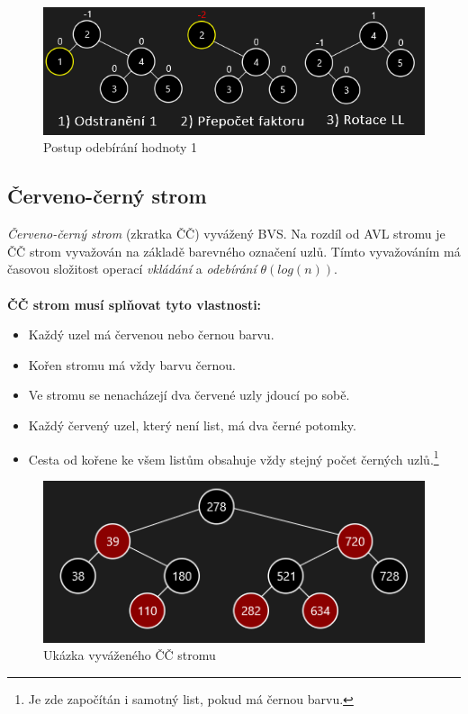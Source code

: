 \documentclass[
  biblatex=false,
  font=serif,
  glossaries=false,
  tables=false,
  theorems=false,
  index
]{kidiplom}
\begin{document}
\begin{figure}[h!]
\centering
	\includegraphics[scale=0.55]{obrazky/16AVLOdebirani.png}
	\caption{Postup odebírání hodnoty 1}
\end{figure}

\newpage
\subsection{Červeno-černý strom}
\indent\indent\textit{Červeno-černý strom} (zkratka ČČ) vyvážený BVS. Na rozdíl od AVL stromu je ČČ strom vyvažován na základě barevného označení uzlů. Tímto vyvažováním má časovou složitost operací \textit{vkládání} a \textit{odebírání} $\theta(log (n))$.\\
\indent\textit{}\cite{dvorsky}\\

\noindent\textbf{ČČ strom musí splňovat tyto vlastnosti:}
\begin{itemize}
\item Každý uzel má červenou nebo černou barvu.
\item Kořen stromu má vždy barvu černou.
\item Ve stromu se nenacházejí dva červené uzly jdoucí po sobě.
\item Každý červený uzel, který není list, má dva černé potomky.
\item Cesta od kořene ke všem listům obsahuje vždy stejný počet černých uzlů.\footnote{Je zde započítán i samotný list, pokud má černou barvu.} 
\end{itemize}

\begin{figure}[h!]
\centering
	\includegraphics[scale=1]{obrazky/17CCUkazka.png}
	\caption{Ukázka vyváženého ČČ stromu}
\end{figure}
\end{document}
